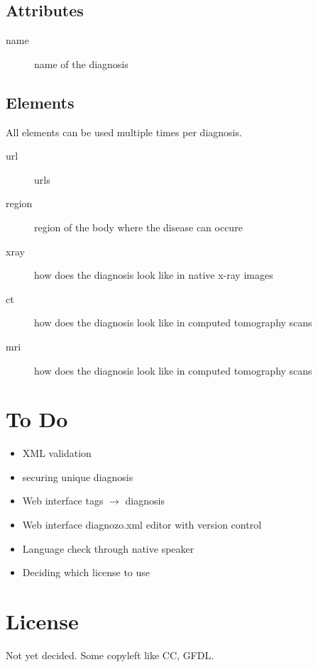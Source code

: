 \documentclass{article}
\begin{document}
\subsection{Attributes}

\begin{description}
	\item[name] name of the diagnosis
\end{description}

\subsection{Elements}
All elements can be used multiple times per diagnosis.

\begin{description}
	\item[url] urls
	\item[region] region of the body where the disease can occure
	\item[xray] how does the diagnosis look like in native x-ray images
	\item[ct] how does the diagnosis look like in computed tomography scans
	\item[mri] how does the diagnosis look like in computed tomography scans
\end{description}

\section{To Do}
\begin{itemize}
\item XML validation
\item securing unique diagnosis
\item Web interface tags $\rightarrow$ diagnosis
\item Web interface diagnozo.xml editor with version control
\item Language check through native speaker
\item Deciding which license to use
\end{itemize}

\section{License}
Not yet decided. Some copyleft like CC, GFDL.
\end{document}
